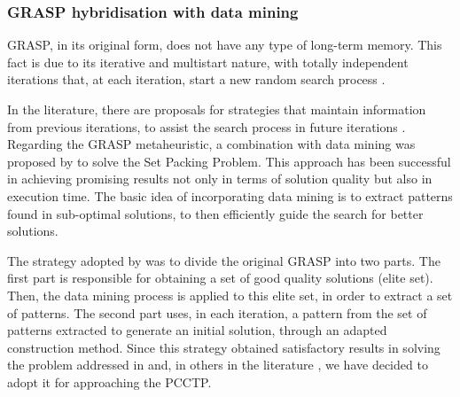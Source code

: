 \documentclass{singlecol-new}
\begin{document}
\subsubsection{GRASP hybridisation with data mining}
GRASP, in its original form, does not have any type of long-term memory. This fact is due to its iterative and multistart nature, with totally independent iterations that, at each iteration, start a new random search process \cite{aloise2011adaptive}.

In the literature, there are proposals for strategies that maintain information from previous iterations, to assist the search process in future iterations \cite{fleurent1999improved, italo, rochat1995probabilistic, plastino2011hybrid, plastino2014adaptive, ribeiro2006hybridization}. Regarding the GRASP metaheuristic, a combination with data mining was proposed by \citet{ribeiro2006hybridization} to solve the Set Packing Problem. This approach has been successful in achieving promising results not only in terms of solution quality but also in execution time. The basic idea of incorporating data mining is to extract patterns found in sub-optimal solutions, to then efficiently guide the search for better solutions.


The strategy adopted by \citet{ribeiro2006hybridization} was to divide the original GRASP into two parts. The first part is responsible for obtaining a set of good quality solutions (elite set). Then, the data mining process is applied to this elite set, in order to extract a set of patterns. The second part uses, in each iteration, a pattern from the set of patterns extracted to generate an initial solution, through an adapted construction method. Since this strategy obtained satisfactory results in solving the problem addressed in \citet {ribeiro2006hybridization} and, in others in the literature \cite{santos2005hybrid, guerine2020hybrid, barbalho2013, guerine14}, we have decided to adopt it for approaching the PCCTP.
\end{document}
